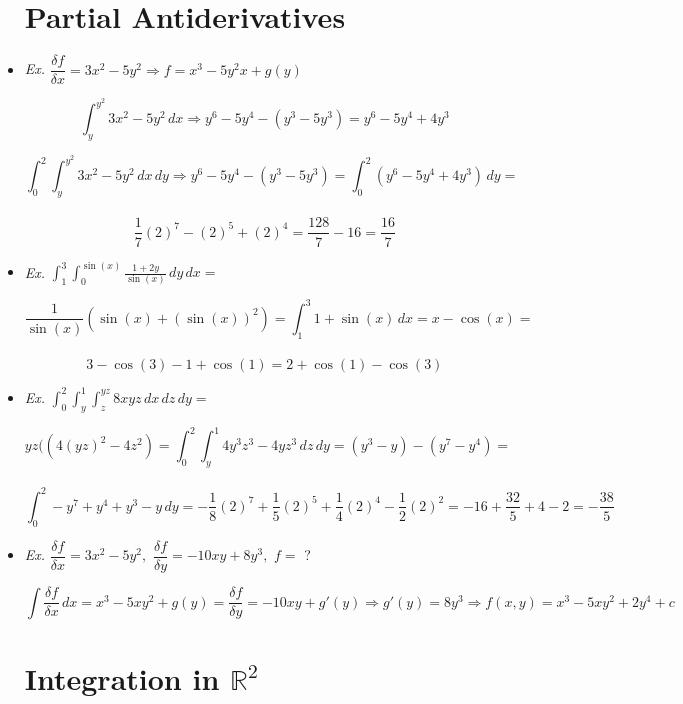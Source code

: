\begin{itemize}

    \section{Partial Antiderivatives}

  \item \textit{Ex. } $\dfrac{\delta f}{\delta x} = 3x^2 - 5y^2\Rightarrow f = x^3 - 5y^2x + g(y)$

  $$\displaystyle \int_{y}^{y^2} 3x^2-5y^2\,dx\Rightarrow y^6 - 5y^4 - (y^3 - 5y^3)= y^6 - 5y^4 + 4y^3$$

  \vspace{5pt}

  $$\displaystyle \int_0^2\int_{y}^{y^2} 3x^2-5y^2\,dx\,dy\Rightarrow y^6 - 5y^4 - (y^3 - 5y^3) = \displaystyle \int_0^2 (y^6 - 5y^4 + 4y^3)\,dy =$$\vspace{-15pt}\\$$ \frac{1}{7}(2)^7-(2)^5+(2)^4 = \frac{128}{7} - 16 = \frac{16}{7}$$

  \item \textit{Ex. } $\displaystyle \int_1^3 \int_0^{\sin(x)} \frac{1+2y}{\sin(x)}\,dy\,dx=$

  $$\frac{1}{\sin(x)}\left( \sin(x)+(\sin(x))^2 \right) = \int_1^3 1 + \sin(x)\,dx = x - \cos(x) =$$\vspace{-15pt}\\$$3 - \cos(3) - 1 + \cos(1) = 2 + \cos(1) - \cos(3)$$

  \item \textit{Ex. } $\displaystyle \int_0^2\int_y^1\int_z^{yz} 8xyz\,dx\,dz\,dy=$

  $$yz((4(yz)^2 - 4z^2) = \int_0^2\int_y^1 4y^3z^3 - 4yz^3\,dz\,dy = (y^3 - y) - (y^7 - y^4) =$$\vspace{-15pt} \\$$\int_0^2 -y^7 + y^4 + y^3 - y\,dy = -\frac{1}{8}(2)^7 + \frac{1}{5}(2)^5 + \frac{1}{4}(2)^4 - \frac{1}{2}(2)^2 = -16 + \frac{32}{5} + 4 - 2 = -\frac{38}{5}$$

  \item \textit{Ex. } $\dfrac{\delta f}{\delta x} = 3x^2-5y^2,\,\,\dfrac{\delta f}{\delta y} = -10xy + 8y^3,\,\, f=$ ?

    $$\int \frac{\delta f}{\delta x}\,dx = x^3 - 5xy^2 + g(y) = \frac{\delta f}{\delta y} = -10xy + g'(y)\Rightarrow g'(y) = 8y^3 \Rightarrow f(x,y) = x^3-5xy^2+2y^4 + c$$

    \section{Integration in $\mathbb{R}^2$}


\end{itemize}
